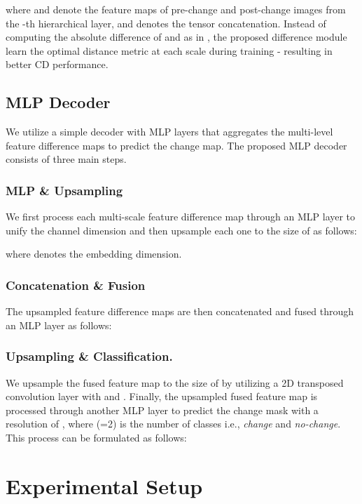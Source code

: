 \documentclass{article}
\begin{document}
where  and  denote the feature maps of pre-change and post-change images from the  -th hierarchical layer, and  denotes the tensor concatenation. Instead of computing the absolute difference of  and  as in \cite{transformer_cd}, the proposed difference module learn the optimal distance metric at each scale during training - resulting in better CD performance.

\subsection{MLP Decoder}
We utilize a simple decoder with MLP layers that aggregates the multi-level feature difference maps to predict the change map. The proposed MLP decoder consists of three main steps.

\subsubsection{MLP \& Upsampling} 
We first process each multi-scale feature difference map through an MLP layer to  unify the channel dimension and then upsample each one to the size of  as follows:


where  denotes the embedding dimension.

\subsubsection{Concatenation \& Fusion} 
The upsampled feature difference maps are then concatenated and fused through an MLP layer as follows:


\subsubsection{Upsampling \& Classification.} We upsample the fused feature map  to the size of  by utilizing a 2D transposed convolution layer with  and . Finally, the upsampled fused feature map is processed through another MLP layer to predict the
change mask  with a resolution of , where  (=2) is the number of classes i.e., \textit{change} and \textit{no-change}. This process can be formulated as follows:



\section{Experimental Setup}
\end{document}
